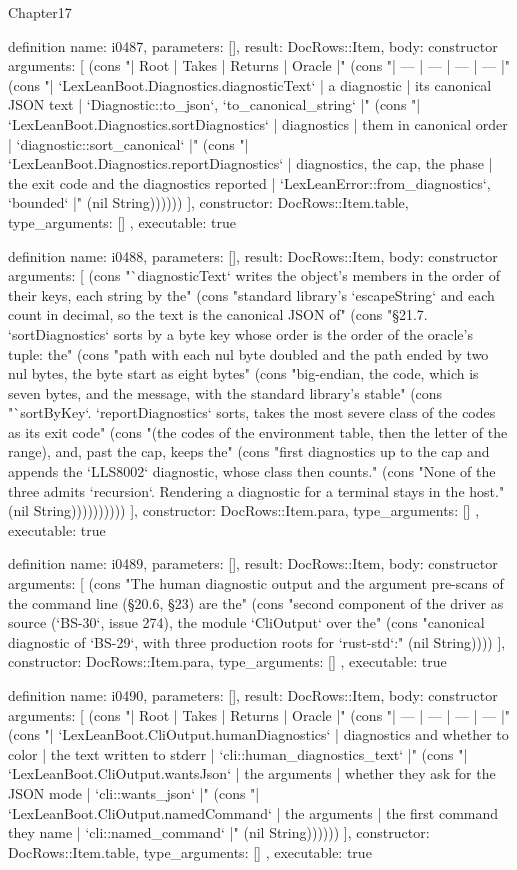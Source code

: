 \begin{lexlean}{Chapter17}
\begin{semanticmodule}
definition{
  name: i0487,
  parameters: [],
  result: DocRows::Item,
  body: constructor{
    arguments: [
      (cons "| Root | Takes | Returns | Oracle |" (cons "| --- | --- | --- | --- |" (cons "| `LexLeanBoot.Diagnostics.diagnosticText` | a diagnostic | its canonical JSON text | `Diagnostic::to_json`, `to_canonical_string` |" (cons "| `LexLeanBoot.Diagnostics.sortDiagnostics` | diagnostics | them in canonical order | `diagnostic::sort_canonical` |" (cons "| `LexLeanBoot.Diagnostics.reportDiagnostics` | diagnostics, the cap, the phase | the exit code and the diagnostics reported | `LexLeanError::from_diagnostics`, `bounded` |" (nil String))))))
    ],
    constructor: DocRows::Item.table,
    type_arguments: []
  },
  executable: true
}

definition{
  name: i0488,
  parameters: [],
  result: DocRows::Item,
  body: constructor{
    arguments: [
      (cons "`diagnosticText` writes the object's members in the order of their keys, each string by the" (cons "standard library's `escapeString` and each count in decimal, so the text is the canonical JSON of" (cons "§21.7. `sortDiagnostics` sorts by a byte key whose order is the order of the oracle's tuple: the" (cons "path with each nul byte doubled and the path ended by two nul bytes, the byte start as eight bytes" (cons "big-endian, the code, which is seven bytes, and the message, with the standard library's stable" (cons "`sortByKey`. `reportDiagnostics` sorts, takes the most severe class of the codes as its exit code" (cons "(the codes of the environment table, then the letter of the range), and, past the cap, keeps the" (cons "first diagnostics up to the cap and appends the `LLS8002` diagnostic, whose class then counts." (cons "None of the three admits `recursion`. Rendering a diagnostic for a terminal stays in the host." (nil String))))))))))
    ],
    constructor: DocRows::Item.para,
    type_arguments: []
  },
  executable: true
}

definition{
  name: i0489,
  parameters: [],
  result: DocRows::Item,
  body: constructor{
    arguments: [
      (cons "The human diagnostic output and the argument pre-scans of the command line (§20.6, §23) are the" (cons "second component of the driver as source (`BS-30`, issue 274), the module `CliOutput` over the" (cons "canonical diagnostic of `BS-29`, with three production roots for `rust-std`:" (nil String))))
    ],
    constructor: DocRows::Item.para,
    type_arguments: []
  },
  executable: true
}

definition{
  name: i0490,
  parameters: [],
  result: DocRows::Item,
  body: constructor{
    arguments: [
      (cons "| Root | Takes | Returns | Oracle |" (cons "| --- | --- | --- | --- |" (cons "| `LexLeanBoot.CliOutput.humanDiagnostics` | diagnostics and whether to color | the text written to stderr | `cli::human_diagnostics_text` |" (cons "| `LexLeanBoot.CliOutput.wantsJson` | the arguments | whether they ask for the JSON mode | `cli::wants_json` |" (cons "| `LexLeanBoot.CliOutput.namedCommand` | the arguments | the first command they name | `cli::named_command` |" (nil String))))))
    ],
    constructor: DocRows::Item.table,
    type_arguments: []
  },
  executable: true
}


\end{semanticmodule}
\end{lexlean}
